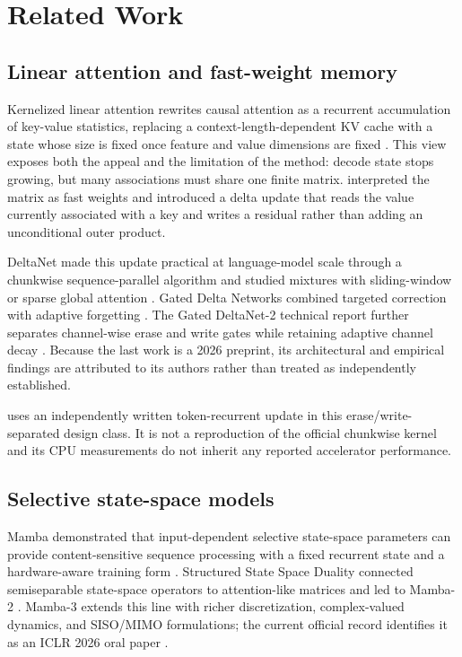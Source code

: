 \section{Related Work}
\label{sec:related-work}

\subsection{Linear attention and fast-weight memory}

Kernelized linear attention rewrites causal attention as a recurrent
accumulation of key-value statistics, replacing a context-length-dependent KV
cache with a state whose size is fixed once feature and value dimensions are
fixed \citep{katharopoulos2020transformers}. This view exposes both the appeal
and the limitation of the method: decode state stops growing, but many
associations must share one finite matrix. \citet{schlag2021linear} interpreted
the matrix as fast weights and introduced a delta update that reads the value
currently associated with a key and writes a residual rather than adding an
unconditional outer product.

DeltaNet made this update practical at language-model scale through a
chunkwise sequence-parallel algorithm and studied mixtures with
sliding-window or sparse global attention \citep{yang2024parallelizing}. Gated
Delta Networks combined targeted correction with adaptive forgetting
\citep{yang2025gated}. The Gated DeltaNet-2 technical report further separates
channel-wise erase and write gates while retaining adaptive channel decay
\citep{hatamizadeh2026gated}. Because the last work is a 2026 preprint, its
architectural and empirical findings are attributed to its authors rather than
treated as independently established.

\ALUCLU uses an independently written token-recurrent update in this
erase/write-separated design class. It is not a reproduction of the official
chunkwise kernel and its CPU measurements do not inherit any reported
accelerator performance.

\subsection{Selective state-space models}

Mamba demonstrated that input-dependent selective state-space parameters can
provide content-sensitive sequence processing with a fixed recurrent state and
a hardware-aware training form \citep{gu2024mamba}. Structured State Space
Duality connected semiseparable state-space operators to attention-like
matrices and led to Mamba-2 \citep{dao2024transformers}. Mamba-3 extends this
line with richer discretization, complex-valued dynamics, and SISO/MIMO
formulations; the current official record identifies it as an ICLR 2026 oral
paper \citep{lahoti2026mamba3}.

